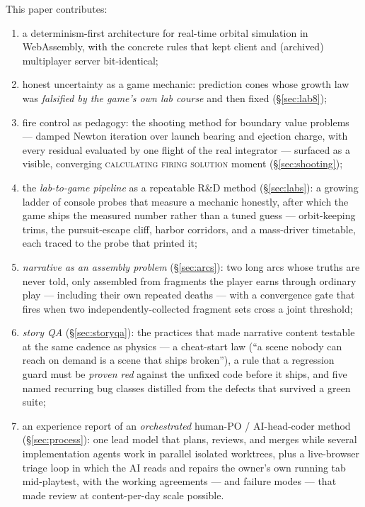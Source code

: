 \documentclass[10pt,twocolumn]{article}
\begin{document}
This paper contributes:
\begin{enumerate}
  \item a determinism-first architecture for real-time orbital simulation in WebAssembly,
        with the concrete rules that kept client and (archived) multiplayer server
        bit-identical;
  \item honest uncertainty as a game mechanic: prediction cones whose growth law was
        \emph{falsified by the game's own lab course} and then fixed (\S\ref{sec:lab8});
  \item fire control as pedagogy: the shooting method for boundary value problems ---
        damped Newton iteration over launch bearing and ejection charge, with every
        residual evaluated by one flight of the real integrator --- surfaced as a visible,
        converging \textsc{calculating firing solution} moment (\S\ref{sec:shooting});
  \item the \emph{lab-to-game pipeline} as a repeatable R\&D method
        (\S\ref{sec:labs}): a growing ladder of console probes that measure a mechanic
        honestly, after which the game ships the measured number rather than a tuned
        guess --- orbit-keeping trims, the pursuit-escape cliff, harbor corridors, and a
        mass-driver timetable, each traced to the probe that printed it;
  \item \emph{narrative as an assembly problem} (\S\ref{sec:arcs}): two long arcs whose
        truths are never told, only assembled from fragments the player earns through
        ordinary play --- including their own repeated deaths --- with a convergence gate
        that fires when two independently-collected fragment sets cross a joint threshold;
  \item \emph{story QA} (\S\ref{sec:storyqa}): the practices that made narrative content
        testable at the same cadence as physics --- a cheat-start law (``a scene nobody can
        reach on demand is a scene that ships broken''), a rule that a regression guard must
        be \emph{proven red} against the unfixed code before it ships, and five named
        recurring bug classes distilled from the defects that survived a green suite;
  \item an experience report of an \emph{orchestrated} human-PO / AI-head-coder method
        (\S\ref{sec:process}): one lead model that plans, reviews, and merges while several
        implementation agents work in parallel isolated worktrees, plus a live-browser
        triage loop in which the AI reads and repairs the owner's own running tab
        mid-playtest, with the working agreements --- and failure modes --- that made
        review at content-per-day scale possible.
\end{enumerate}
\end{document}
